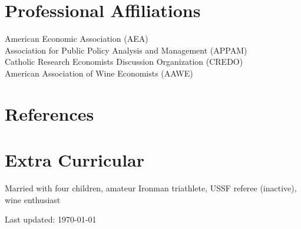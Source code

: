 \documentclass[roman]{moderncv}
\begin{document}
\section{Professional Affiliations}
American Economic Association (AEA) \\
Association for Public Policy Analysis and Management (APPAM) \\
Catholic Research Economists Discussion Organization (CREDO) \\
American Association of Wine Economists (AAWE)

\vspace{3mm}
\section{References}


\vspace{3mm}
\section{Extra Curricular}
Married with four children, amateur Ironman triathlete, USSF referee (inactive), wine enthusiast

\vfill
\footnotesize
Last updated: \monthyeardate\today
\end{document}
